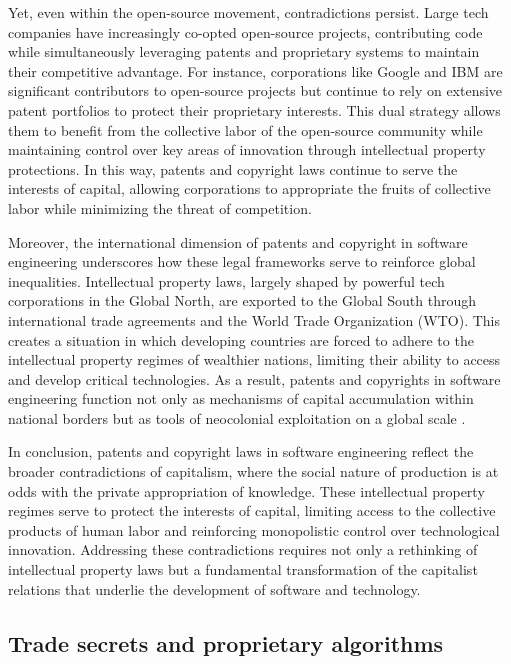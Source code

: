 \begin{refsection}
Yet, even within the open-source movement, contradictions persist. Large tech companies have increasingly co-opted open-source projects, contributing code while simultaneously leveraging patents and proprietary systems to maintain their competitive advantage. For instance, corporations like Google and IBM are significant contributors to open-source projects but continue to rely on extensive patent portfolios to protect their proprietary interests. This dual strategy allows them to benefit from the collective labor of the open-source community while maintaining control over key areas of innovation through intellectual property protections. In this way, patents and copyright laws continue to serve the interests of capital, allowing corporations to appropriate the fruits of collective labor while minimizing the threat of competition.

Moreover, the international dimension of patents and copyright in software engineering underscores how these legal frameworks serve to reinforce global inequalities. Intellectual property laws, largely shaped by powerful tech corporations in the Global North, are exported to the Global South through international trade agreements and the World Trade Organization (WTO). This creates a situation in which developing countries are forced to adhere to the intellectual property regimes of wealthier nations, limiting their ability to access and develop critical technologies. As a result, patents and copyrights in software engineering function not only as mechanisms of capital accumulation within national borders but as tools of neocolonial exploitation on a global scale \cite[pp.~53-55]{may2010}.

In conclusion, patents and copyright laws in software engineering reflect the broader contradictions of capitalism, where the social nature of production is at odds with the private appropriation of knowledge. These intellectual property regimes serve to protect the interests of capital, limiting access to the collective products of human labor and reinforcing monopolistic control over technological innovation. Addressing these contradictions requires not only a rethinking of intellectual property laws but a fundamental transformation of the capitalist relations that underlie the development of software and technology.

\subsection{Trade secrets and proprietary algorithms}


\end{refsection}
